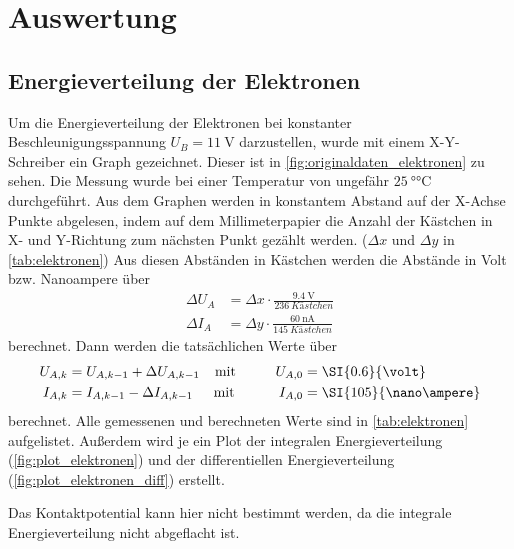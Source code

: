 \section{Auswertung}
\label{sec:Auswertung}

\subsection{Energieverteilung der Elektronen}
\label{ssec:auswwertung_elektronen}

Um die Energieverteilung der Elektronen bei konstanter Beschleunigungsspannung $U_B=\SI{11}{\volt}$ darzustellen, wurde mit einem X-Y-Schreiber ein Graph gezeichnet. 
Dieser ist in \autoref{fig:originaldaten_elektronen} zu sehen.
Die Messung wurde bei einer Temperatur von ungefähr $\SI{25}{\degree\celsius}$ durchgeführt.
Aus dem Graphen werden in konstantem Abstand auf der X-Achse Punkte abgelesen, indem auf dem Millimeterpapier die Anzahl der Kästchen in X- und Y-Richtung zum nächsten Punkt gezählt werden. ($\Delta x$ und $\Delta y$ in \autoref{tab:elektronen})
Aus diesen Abständen in Kästchen werden die Abstände in Volt bzw. Nanoampere über
\begin{align}
    \Delta U_A &= \Delta x \cdot \frac{\SI{9.4}{\volt}}{\SI{236}{Kästchen}} \\
    \Delta I_A &= \Delta y \cdot \frac{\SI{60}{\nano\ampere}}{\SI{145}{Kästchen}}
\end{align}
berechnet.
Dann werden die tatsächlichen Werte über
\begin{align}
    U_{A,k} &= U_{A,k-1} + \Delta U_{A,k-1} &\text{mit\hspace{1cm}} U_{A,0} &= \SI{0.6}{\volt} \\
    I_{A,k} &= I_{A,k-1} - \Delta I_{A,k-1} &\text{mit \hspace{1cm}} I_{A,0} &= \SI{105}{\nano\ampere}
\end{align}
berechnet.
Alle gemessenen und berechneten Werte sind in \autoref{tab:elektronen} aufgelistet.
Außerdem wird je ein Plot der integralen Energieverteilung (\autoref{fig:plot_elektronen}) und der differentiellen Energieverteilung (\autoref{fig:plot_elektronen_diff}) erstellt.

Das Kontaktpotential kann hier nicht bestimmt werden, da die integrale Energieverteilung nicht abgeflacht ist.

